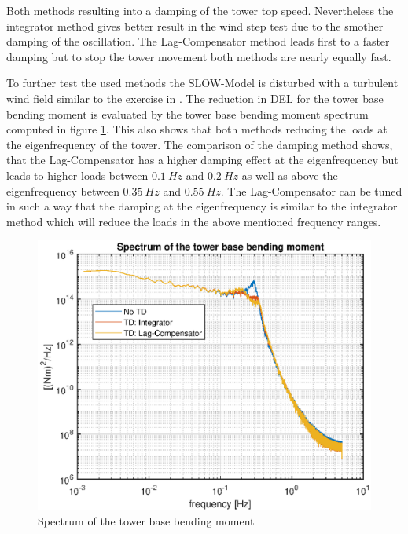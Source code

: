 Both methods resulting into a damping of the tower top speed. Nevertheless the integrator method gives better result in the wind step test due to the smother damping of the oscillation. The Lag-Compensator method leads first to a faster damping but to stop the tower movement both methods are nearly equally fast. 

To further test the used methods the SLOW-Model is disturbed with a turbulent wind field similar to the exercise in \cite{SchlipfLecture}. The reduction in DEL for the tower base bending moment is evaluated by the tower base bending moment spectrum computed in figure \ref{fig:TDDEL}. This also shows that both methods reducing the loads at the eigenfrequency of the tower. The comparison of the damping method shows, that the Lag-Compensator has a higher damping effect at the eigenfrequency but leads to higher loads between $\SI{0.1}{Hz}$ and $\SI{0.2}{Hz}$ as well as above the eigenfrequency between $\SI{0.35}{Hz}$ and $\SI{0.55}{Hz}$. The Lag-Compensator can be tuned in such a way that the damping at the eigenfrequency is similar to the integrator method which will reduce the loads in the above mentioned frequency ranges.
\begin{figure}[h]
	\centering	
	\includegraphics[width=12cm]{Figures/TDSpectrum.eps}
	\caption{Spectrum of the tower base bending moment}
	\label{fig:TDDEL}
\end{figure}      